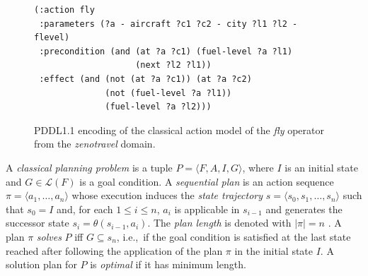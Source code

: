 \documentclass[letterpaper]{article} %
\newcommand{\tup}[1]{{\langle #1 \rangle}}
\begin{document}
\begin{figure}[hbt!]
	\begin{scriptsize}
		\begin{verbatim}
(:action fly 
 :parameters (?a - aircraft ?c1 ?c2 - city ?l1 ?l2 - flevel)
 :precondition (and (at ?a ?c1) (fuel-level ?a ?l1)
                    (next ?l2 ?l1))
 :effect (and (not (at ?a ?c1)) (at ?a ?c2)
              (not (fuel-level ?a ?l1))
              (fuel-level ?a ?l2)))
		\end{verbatim}
	\end{scriptsize}
	\caption{PDDL1.1 encoding of the classical action model of the {\em fly} operator from the {\em zenotravel} domain.}
	\label{fig:flyc}
\end{figure}


A {\em classical planning problem} is a tuple $P=\tup{F,A,I,G}$, where $I$ is an initial state and $G\in\mathcal{L}(F)$ is a goal condition. A {\em sequential plan} is an action sequence $\pi=\tup{a_1, \ldots, a_n}$ whose execution induces the {\em state trajectory} $s=\tup{s_0, s_1, \ldots, s_n}$ such that $s_0=I$ and, for each {\small $1\leq i\leq n$}, $a_i$ is applicable in $s_{i-1}$ and generates the successor state $s_i=\theta(s_{i-1},a_i)$. The {\em plan length} is denoted with $|\pi|=n$ . A plan $\pi$ {\em solves} $P$ iff $G\subseteq s_n$, i.e.,~if the goal condition is satisfied at the last state reached after following the application of the plan $\pi$ in the initial state $I$. A solution plan for $P$ is {\em optimal} if it has minimum length.
\end{document}
